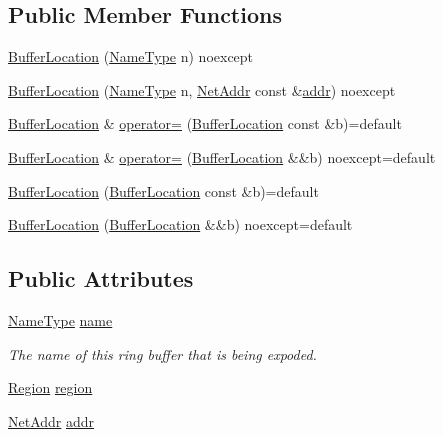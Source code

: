 \subsection*{Public Member Functions}
\begin{DoxyCompactItemize}
\item 
\hyperlink{structregistry_1_1BufferLocation_a30830e0d0cfae8971273c57a894242d9}{Buffer\+Location} (\hyperlink{structregistry_1_1BufferLocation_ad3c2279012b74798fa1e348507020fa4}{Name\+Type} n) noexcept
\item 
\hyperlink{structregistry_1_1BufferLocation_a7e2e78fc0a567f47a9bb01e2d3683984}{Buffer\+Location} (\hyperlink{structregistry_1_1BufferLocation_ad3c2279012b74798fa1e348507020fa4}{Name\+Type} n, \hyperlink{namespaceregistry_a2d7eac31eb792025667bcebdfe93dbf2}{Net\+Addr} const \&\hyperlink{structregistry_1_1BufferLocation_ad22f3b9cd359ad88ad3ddcad69fdb740}{addr}) noexcept
\item 
\hyperlink{structregistry_1_1BufferLocation}{Buffer\+Location} \& \hyperlink{structregistry_1_1BufferLocation_a545aea2299f77c020043efc9da9ab697}{operator=} (\hyperlink{structregistry_1_1BufferLocation}{Buffer\+Location} const \&b)=default
\item 
\hyperlink{structregistry_1_1BufferLocation}{Buffer\+Location} \& \hyperlink{structregistry_1_1BufferLocation_ac20495af404297a191fc8f4ed869e7c0}{operator=} (\hyperlink{structregistry_1_1BufferLocation}{Buffer\+Location} \&\&b) noexcept=default
\item 
\hyperlink{structregistry_1_1BufferLocation_a13e370aa3a10d57ca0f7a3ab109f9405}{Buffer\+Location} (\hyperlink{structregistry_1_1BufferLocation}{Buffer\+Location} const \&b)=default
\item 
\hyperlink{structregistry_1_1BufferLocation_a64f5245e74c8d9e544dc19057bcc2798}{Buffer\+Location} (\hyperlink{structregistry_1_1BufferLocation}{Buffer\+Location} \&\&b) noexcept=default
\end{DoxyCompactItemize}
\subsection*{Public Attributes}
\begin{DoxyCompactItemize}
\item 
\hyperlink{structregistry_1_1BufferLocation_ad3c2279012b74798fa1e348507020fa4}{Name\+Type} \hyperlink{structregistry_1_1BufferLocation_a9941e0d8dceeb136a95c50bef3792082}{name}
\begin{DoxyCompactList}\small\item\em The name of this ring buffer that is being expoded. \end{DoxyCompactList}\item 
\hyperlink{structregistry_1_1BufferLocation_a07b156ecd0690dbebb5cba36d4d23ba0}{Region} \hyperlink{structregistry_1_1BufferLocation_ad05676e193d5259c84e53f7037ed3878}{region}
\item 
\hyperlink{namespaceregistry_a2d7eac31eb792025667bcebdfe93dbf2}{Net\+Addr} \hyperlink{structregistry_1_1BufferLocation_ad22f3b9cd359ad88ad3ddcad69fdb740}{addr}
\end{DoxyCompactItemize}


